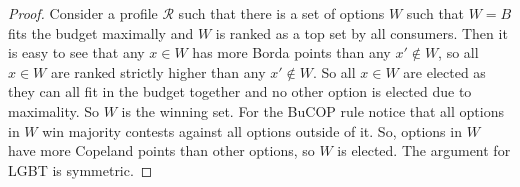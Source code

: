 \documentclass{article}
\begin{document}
\begin{proof}\renewcommand{\qedsymbol}{}
Consider a profile $\mathcal{R}$ such that there is a set of options $W$ such that $W=B$ fits the budget maximally and $W$ is ranked as a top set by all consumers. Then it is easy to see that any $x \in W$ has more Borda points than any $x' \notin W$, so all $x \in W$ are ranked strictly higher than any $x' \notin W$. So all $x \in W$ are elected as they can all fit in the budget together and no other option is elected due to maximality. So $W$ is the winning set. For the BuCOP rule notice that all options in $W$ win majority contests against all options outside of it. So, options in $W$ have more Copeland points than other options, so $W$ is elected. The argument for LGBT is symmetric.
\end{proof}
\end{document}

